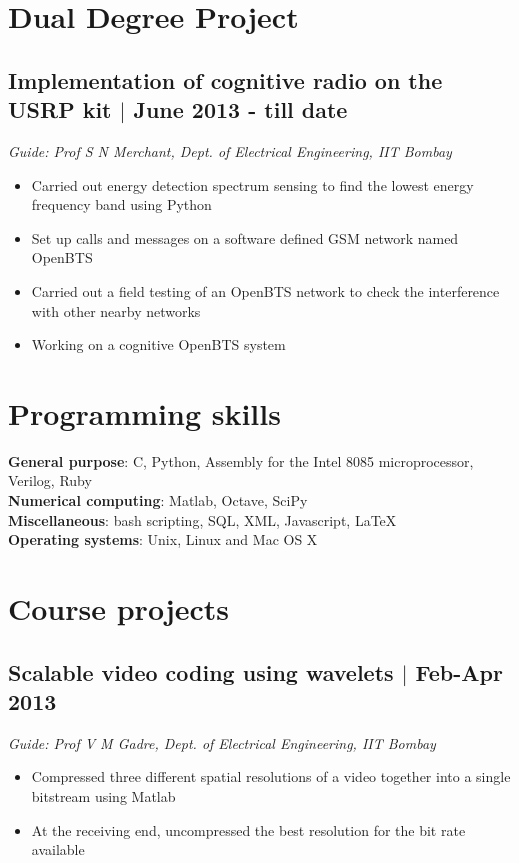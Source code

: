 \documentclass[12pt]{article}
\begin{document}
\setlength{\parindent}{0pt}
 


\vspace*{5\baselineskip}

\section*{Dual Degree Project}

\subsection*{Implementation of cognitive radio on the USRP kit $\vert$  June 2013 - till date}
\emph{Guide: Prof S N Merchant, Dept. of Electrical Engineering, IIT Bombay} 
\begin{itemize}
\item Carried out energy detection spectrum sensing to find the lowest energy frequency band using Python
\item Set up calls and messages on a software defined GSM network named OpenBTS
\item Carried out a field testing of an OpenBTS network to check the interference with other nearby networks 
\item Working on a cognitive OpenBTS system 
\end{itemize}

\section*{Programming skills}
\textbf{General purpose}: C, Python, Assembly for the Intel 8085 microprocessor, Verilog, Ruby \\
\textbf{Numerical computing}: Matlab, Octave, SciPy \\
\textbf{Miscellaneous}: bash scripting, SQL, XML, Javascript, LaTeX \\
\textbf{Operating systems}: Unix, Linux and Mac OS X

\section*{Course projects}
\subsection*{Scalable video coding using wavelets $\vert$  Feb-Apr 2013}
\emph{Guide: Prof V M Gadre, Dept. of Electrical Engineering, IIT Bombay} 
\begin{itemize} 
\item Compressed three different spatial resolutions of a video together into a single bitstream using Matlab
\item At the receiving end, uncompressed the best resolution for the bit rate available 
\end{itemize}
\end{document}
